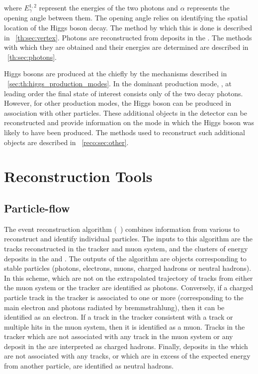 where $E_{\gamma}^{1,2}$ represent the energies of the two photons and $\alpha$ represents the opening angle between them. The opening angle relies on identifying the spatial location of the Higgs boson decay. The method by which this is done is described in \Sec~\ref{th:sec:vertex}. Photons are reconstructed from deposits in the \CMS \ECAL. The methods with  which they are obtained and their energies are determined are described in \Sec~\ref{th:sec:photons}.

Higgs bosons are produced at the \LHC chiefly by the mechanisms described in \Sec~\ref{sec:th:higgs_production_modes}. In the dominant production mode, \ggH, at leading order the final state of interest consists only of the two decay photons. However, for other production modes, the Higgs boson can be produced in association with other particles. These additional objects in the detector can be reconstructed and provide information on the mode in which the Higgs boson was likely to have been produced. The methods used to reconstruct such additional objects are described in \Sec~\ref{reco:sec:other}.

\section{Reconstruction Tools}

\subsection{Particle-flow}
\label{reco:sec:pf}

The \PF event reconstruction algorithm (~\cite{CMS-PAS-PFT-09-001,CMS-PAS-PFT-10-001}) combines information from various \CMS \subdetector\s to reconstruct and identify individual particles. The inputs to this algorithm are the tracks reconstructed in the tracker and muon system, and the clusters of energy deposits in the \ECAL and \HCAL. The outputs of the algorithm are objects corresponding to stable particles (photons, electrons, muons, charged hadrons or neutral hadrons). In this scheme, \ECAL \SC\s which are not on the extrapolated trajectory of tracks from either the muon system or the tracker are identified as photons. Conversely, if a charged particle track in the tracker is associated to one or more \ECAL \SC (corresponding to the main electron and photons radiated by bremmstrahlung), then it can be identified as an electron. If a track in the tracker consistent with a track or multiple hits in the muon system, then it is identified as a muon. Tracks in the tracker which are not associated with any track in the muon system or any deposit in the \ECAL are interpreted as charged hadrons. Finally, deposits in the \HCAL which are not associated with any tracks, or which are in excess of the expected \HCAL energy from another \PF particle, are identified as neutral hadrons.

